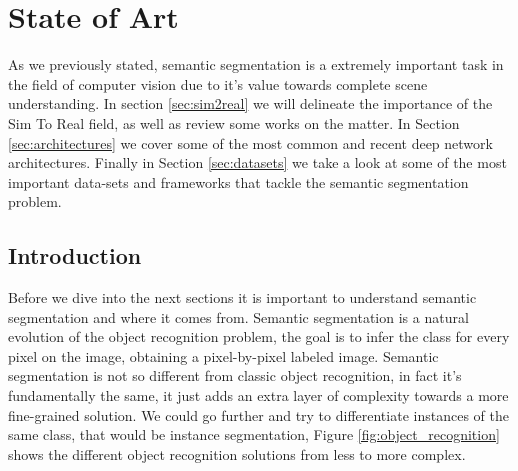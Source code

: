 
\chapter{State of Art}
\label{marcoteorico}
As we previously stated, semantic segmentation is a extremely important task in the field of computer vision due to it's value towards complete scene understanding.
In section \ref{sec:sim2real} we will delineate the importance of the Sim To Real field, as well as review some works on the matter. In Section \ref{sec:architectures} we cover some of the most common and recent deep network architectures. Finally in Section \ref{sec:datasets} we take a look at some of the most important data-sets and frameworks that tackle the semantic segmentation problem. 

\section{Introduction}
Before we dive into the next sections it is important to understand semantic segmentation and where it comes from. Semantic segmentation is a natural evolution of the object recognition problem, the goal is to infer the class for every pixel on the image, obtaining a pixel-by-pixel labeled image. 
Semantic segmentation is not so different from classic object recognition, in fact it's fundamentally the same, it just adds an extra layer of complexity towards a more fine-grained solution. We could go further and try to differentiate instances of the same class, that would be instance segmentation, Figure \ref{fig:object_recognition} shows the different object recognition solutions from less to more complex.


